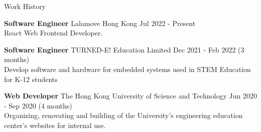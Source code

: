 \documentclass{resume} %
\begin{document}
\begin{rSection}{Work History}
    \vspace{-1.25em}
    \item \textbf{Software Engineer} {Lalamove Hong Kong} \hfill Jul 2022 - Present \\
    React Web Frontend Developer.
    \item \textbf{Software Engineer} {TURNED-E! Education Limited} \hfill Dec 2021 - Feb 2022 (3 months) \\
    Develop software and hardware for embedded systems used in STEM Education for K-12 students
    \item \textbf{Web Developer} {The Hong Kong University of Science and Technology} \hfill Jun 2020 - Sep 2020 (4 months) \\
    Organizing, renovating and building of the University's engineering education center's websites for internal use.
\end{rSection}

\end{document}
